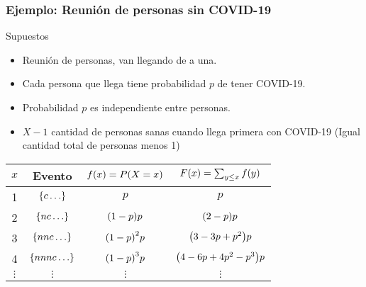 \documentclass[table]{beamer}
\begin{document}
\begin{frame}
    \frametitle{Ejemplo: Reunión de personas sin COVID-19}
    \begin{block}{Supuestos}
        \begin{itemize}
            \item Reunión de personas, van llegando de a una.
            \item Cada persona que llega tiene probabilidad $p$ de tener COVID-19.
            \item Probabilidad $p$ es independiente entre personas.
            \item $X-1$ cantidad de personas sanas cuando llega primera con COVID-19 (Igual cantidad total de personas menos 1)
        \end{itemize}
    \end{block}
    \begin{center}
        \begin{tabular}{c|c|c|c}
            $x$ & Evento & $\ff{x} = \prob{X = x}$ & $\FF{x} = \sum_{y \leq x} \ff{y}$ \\
            \hline
            1 & $\bparens{c \ldots}$ & $p$ & $p$ \\
            2 & $\bparens{nc \ldots}$ & $\parens{1 - p} p$ & $\parens{2 - p} p$ \\
            3 & $\bparens{nnc \ldots}$ & $\parens{1 - p}^{2} p$ & $\parens{3 - 3 p + p^{2}} p$ \\
            4 & $\bparens{nnnc \ldots}$ & $\parens{1 - p}^{3} p$ & $\parens{4 - 6 p + 4 p^{2} - p^{3}} p$ \\
            $\vdots$ & $\vdots$ & $\vdots$ & $\vdots$
        \end{tabular}
    \end{center}
\end{frame}
\end{document}
